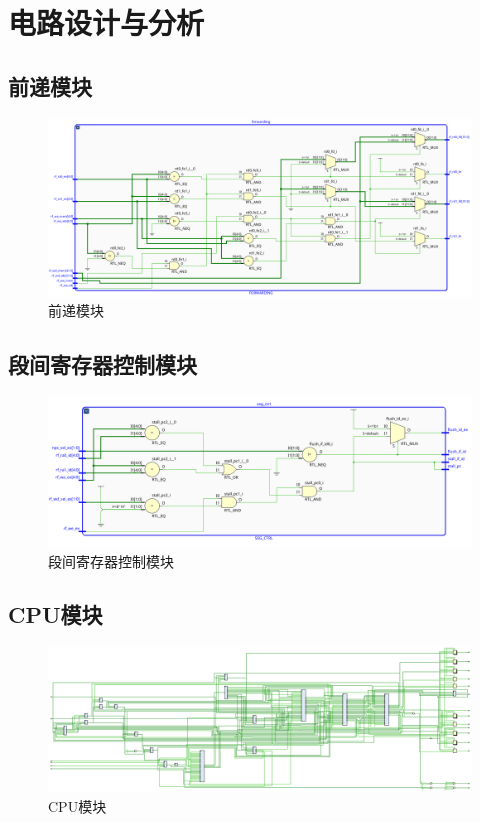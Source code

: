 \documentclass[12pt,a4paper]{ctexart}
\begin{document}
\section{电路设计与分析}
\subsection{前递模块}
\begin{figure}[H]
    \centering
    \includegraphics[scale=0.4]{pic/1pic.png}
    \caption{前递模块}
\end{figure}
\subsection{段间寄存器控制模块}
\begin{figure}[H]
    \centering
    \includegraphics[scale=0.4]{pic/2pic.png}
    \caption{段间寄存器控制模块}
\end{figure}
\subsection{CPU模块}
\begin{figure}[H]
    \centering
    \includegraphics[scale=0.4]{pic/cpu.png}
    \caption{CPU模块}
\end{figure}
\end{document}
